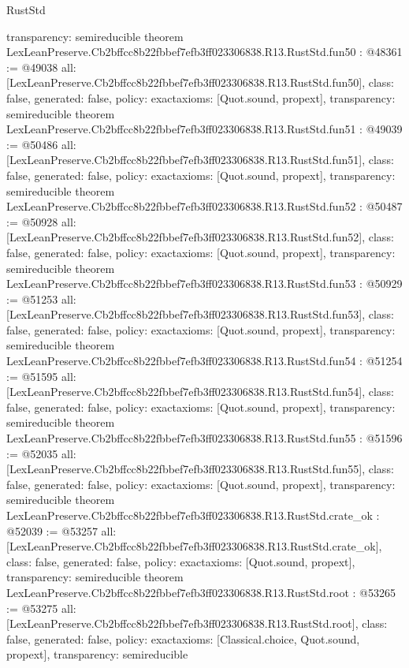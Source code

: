 \begin{lexlean}{RustStd}
\begin{coremodule}
{  transparency: semireducible
}
theorem LexLeanPreserve.Cb2bffcc8b22fbbef7efb3ff023306838.R13.RustStd.fun50 : @48361 := @49038 {
  all: [LexLeanPreserve.Cb2bffcc8b22fbbef7efb3ff023306838.R13.RustStd.fun50],
  class: false,
  generated: false,
  policy: exact{axioms: [Quot.sound, propext]},
  transparency: semireducible
}
theorem LexLeanPreserve.Cb2bffcc8b22fbbef7efb3ff023306838.R13.RustStd.fun51 : @49039 := @50486 {
  all: [LexLeanPreserve.Cb2bffcc8b22fbbef7efb3ff023306838.R13.RustStd.fun51],
  class: false,
  generated: false,
  policy: exact{axioms: [Quot.sound, propext]},
  transparency: semireducible
}
theorem LexLeanPreserve.Cb2bffcc8b22fbbef7efb3ff023306838.R13.RustStd.fun52 : @50487 := @50928 {
  all: [LexLeanPreserve.Cb2bffcc8b22fbbef7efb3ff023306838.R13.RustStd.fun52],
  class: false,
  generated: false,
  policy: exact{axioms: [Quot.sound, propext]},
  transparency: semireducible
}
theorem LexLeanPreserve.Cb2bffcc8b22fbbef7efb3ff023306838.R13.RustStd.fun53 : @50929 := @51253 {
  all: [LexLeanPreserve.Cb2bffcc8b22fbbef7efb3ff023306838.R13.RustStd.fun53],
  class: false,
  generated: false,
  policy: exact{axioms: [Quot.sound, propext]},
  transparency: semireducible
}
theorem LexLeanPreserve.Cb2bffcc8b22fbbef7efb3ff023306838.R13.RustStd.fun54 : @51254 := @51595 {
  all: [LexLeanPreserve.Cb2bffcc8b22fbbef7efb3ff023306838.R13.RustStd.fun54],
  class: false,
  generated: false,
  policy: exact{axioms: [Quot.sound, propext]},
  transparency: semireducible
}
theorem LexLeanPreserve.Cb2bffcc8b22fbbef7efb3ff023306838.R13.RustStd.fun55 : @51596 := @52035 {
  all: [LexLeanPreserve.Cb2bffcc8b22fbbef7efb3ff023306838.R13.RustStd.fun55],
  class: false,
  generated: false,
  policy: exact{axioms: [Quot.sound, propext]},
  transparency: semireducible
}
theorem LexLeanPreserve.Cb2bffcc8b22fbbef7efb3ff023306838.R13.RustStd.crate_ok : @52039 := @53257 {
  all: [LexLeanPreserve.Cb2bffcc8b22fbbef7efb3ff023306838.R13.RustStd.crate_ok],
  class: false,
  generated: false,
  policy: exact{axioms: [Quot.sound, propext]},
  transparency: semireducible
}
theorem LexLeanPreserve.Cb2bffcc8b22fbbef7efb3ff023306838.R13.RustStd.root : @53265 := @53275 {
  all: [LexLeanPreserve.Cb2bffcc8b22fbbef7efb3ff023306838.R13.RustStd.root],
  class: false,
  generated: false,
  policy: exact{axioms: [Classical.choice, Quot.sound, propext]},
  transparency: semireducible
}


\end{coremodule}
\end{lexlean}
